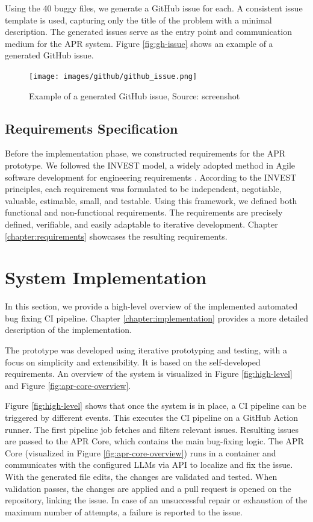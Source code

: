 Using the 40 buggy files, we generate a GitHub issue for each. A consistent issue template is used, capturing only the title of the problem with a minimal description. The generated issues serve as the entry point and communication medium for the APR system. Figure \ref{fig:gh-issue} shows an example of a generated GitHub issue.

\begin{figure}[H]
    \centering
    \texttt{[image: images/github/github\_issue.png]}
    \caption{Example of a generated GitHub issue, Source: screenshot}
    \label{fig:gh-issue2}
\end{figure}

\subsection{Requirements Specification}

Before the implementation phase, we constructed requirements for the \ac{APR} prototype. We followed the INVEST model, a widely adopted method in Agile software development for engineering requirements \cite{10.5555/984017}. According to the INVEST principles, each requirement was formulated to be independent, negotiable, valuable, estimable, small, and testable. Using this framework, we defined both functional and non-functional requirements. The requirements are precisely defined, verifiable, and easily adaptable to iterative development. Chapter \ref{chapter:requirements} showcases the resulting requirements.

\section{System Implementation}

In this section, we provide a high-level overview of the implemented automated bug fixing \ac{CI} pipeline. Chapter \ref{chapter:implementation} provides a more detailed description of the implementation.

The prototype was developed using iterative prototyping and testing, with a focus on simplicity and extensibility. It is based on the self-developed requirements. An overview of the system is visualized in Figure \ref{fig:high-level} and Figure \ref{fig:apr-core-overview}.

Figure \ref{fig:high-level} shows that once the system is in place, a \ac{CI} pipeline can be triggered by different events. This executes the CI pipeline on a GitHub Action runner. The first pipeline job fetches and filters relevant issues. Resulting issues are passed to the APR Core, which contains the main bug-fixing logic. The APR Core (visualized in Figure \ref{fig:apr-core-overview}) runs in a container and communicates with the configured \acp{LLM} via \ac{API} to localize and fix the issue. With the generated file edits, the changes are validated and tested. When validation passes, the changes are applied and a pull request is opened on the repository, linking the issue. In case of an unsuccessful repair or exhaustion of the maximum number of attempts, a failure is reported to the issue.

